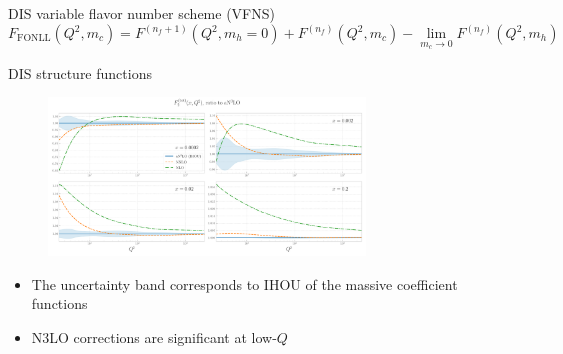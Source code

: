 \documentclass[aspectratio=169, 9pt,t]{beamer}
\begin{document}
\begin{frame}{DIS variable flavor number scheme (VFNS)}
  \vspace*{1em}
  \begin{equation*}
    F_\mathrm{FONLL}(Q^2,m_c) =F^{(n_f+1)}(Q^2,m_h=0)
    +F^{(n_f)}(Q^2,m_c)-\lim_{m_c\rightarrow 0}F^{(n_f)}(Q^2,m_h)
  \end{equation*}



\end{frame}




\begin{frame}{DIS structure functions}
  \begin{figure}[!t]
    \centering
    \includegraphics[width=0.75\textwidth]{figures/F2_total.pdf}
  \end{figure}
  \begin{itemize}
    \item The uncertainty band corresponds to IHOU of the massive coefficient functions
    \item N3LO corrections are significant at low-$Q$
  \end{itemize}
\end{frame}
\end{document}
